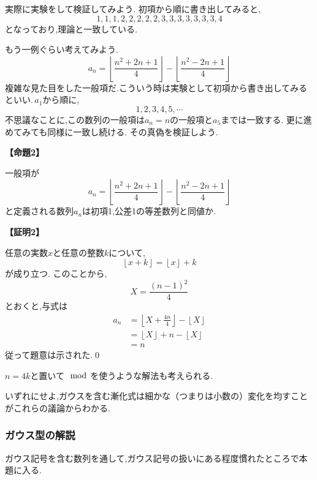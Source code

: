     実際に実験をして検証してみよう.
    初項から順に書き出してみると,
    \[
      1,1,1,2,2,2,2,2,3,3,3,3,3,3,3,4
    \]
    となっており,理論と一致している.

    もう一例ぐらい考えてみよう.
    \[
      a_{n}=\left\lfloor \frac{n^2+2n+1}{4} \right\rfloor -\left\lfloor \frac{n^2-2n+1}{4} \right\rfloor
    \]
    複雑な見た目をした一般項だ.こういう時は実験として初項から書き出してみるといい.\,$a_1$から順に,
    \[
      1,2,3,4,5,\cdots
    \]
    不思議なことに,この数列の一般項は$a_n=n$の一般項と$a_5$までは一致する.
    更に進めてみても同様に一致し続ける.
    その真偽を検証しよう.

    \noindent \textbf{【命題2】}
    \begin{smallquote}
      一般項が
      \[
        a_{n}=\left\lfloor \frac{n^2+2n+1}{4} \right\rfloor -\left\lfloor \frac{n^2-2n+1}{4} \right\rfloor
      \]
      と定義される数列$a_n$は初項1,公差1の等差数列と同値か.
    \end{smallquote}
    \noindent \textbf{【証明2】}
    \begin{smallquote}
      任意の実数$x$と任意の整数$k$について,
      \[
        \left\lfloor x+k \right\rfloor=\left\lfloor x \right\rfloor +k
      \]
      が成り立つ.
      このことから,
      \[
        X=\frac{(n-1)^2}{4}
      \]
      とおくと,与式は
      \begin{align*}
        a_n & =\left\lfloor X+\frac{4n}{4} \right\rfloor-\left\lfloor X \right\rfloor \\
            & =\left\lfloor X \right\rfloor+n-\left\lfloor X \right\rfloor            \\
            & =n
      \end{align*}
      従って題意は示された.\qed
    \end{smallquote}
    $n=4k$と置いて$\mod$を使うような解法も考えられる.

    いずれにせよ,ガウスを含む漸化式は細かな（つまりは小数の）変化を均すことがこれらの議論からわかる.

  \subsubsection{ガウス型の解説}
    ガウス記号を含む数列を通して,ガウス記号の扱いにある程度慣れたところで本題に入る.

